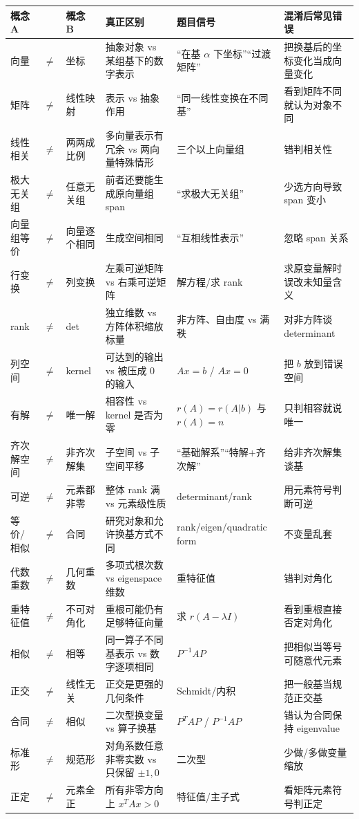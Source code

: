 \documentclass[11pt,a4paper,openany]{ctexbook}
\begin{document}
\begin{longtable}{L{1.7cm}@{}>{\centering\arraybackslash}p{0.35cm}@{}L{1.7cm}L{3.3cm}L{3.3cm}L{\dimexpr\linewidth-10.72cm\relax}}
\toprule
\textbf{概念 A} & & \textbf{概念 B} & \textbf{真正区别} & \textbf{题目信号} & \textbf{混淆后常见错误}\\
\midrule
向量 & $\neq$ & 坐标 & 抽象对象 vs 某组基下的数字表示 & “在基 $\alpha$ 下坐标”“过渡矩阵” & 把换基后的坐标变化当成向量变化\\
矩阵 & $\neq$ & 线性映射 & 表示 vs 抽象作用 & “同一线性变换在不同基” & 看到矩阵不同就认为对象不同\\
线性相关 & $\neq$ & 两两成比例 & 多向量表示有冗余 vs 两向量特殊情形 & 三个以上向量组 & 错判相关性\\
极大无关组 & $\neq$ & 任意无关组 & 前者还要能生成原向量组 span & “求极大无关组” & 少选方向导致 span 变小\\
向量组等价 & $\neq$ & 向量逐个相同 & 生成空间相同 & “互相线性表示” & 忽略 span 关系\\
行变换 & $\neq$ & 列变换 & 左乘可逆矩阵 vs 右乘可逆矩阵 & 解方程/求 rank & 求原变量解时误改未知量含义\\
rank & $\neq$ & det & 独立维数 vs 方阵体积缩放标量 & 非方阵、自由度 vs 满秩 & 对非方阵谈 determinant\\
列空间 & $\neq$ & kernel & 可达到的输出 vs 被压成 0 的输入 & $Ax=b$ / $Ax=0$ & 把 $b$ 放到错误空间\\
有解 & $\neq$ & 唯一解 & 相容性 vs kernel 是否为零 & $r(A)=r(A|b)$ 与 $r(A)=n$ & 只判相容就说唯一\\
齐次解空间 & $\neq$ & 非齐次解集 & 子空间 vs 子空间平移 & “基础解系”“特解+齐次解” & 给非齐次解集谈基\\
可逆 & $\neq$ & 元素都非零 & 整体 rank 满 vs 元素级性质 & determinant/rank & 用元素符号判断可逆\\
等价/相似 & $\neq$ & 合同 & 研究对象和允许换基方式不同 & rank/eigen/quadratic form & 不变量乱套\\
代数重数 & $\neq$ & 几何重数 & 多项式根次数 vs eigenspace 维数 & 重特征值 & 错判对角化\\
重特征值 & $\neq$ & 不可对角化 & 重根可能仍有足够特征向量 & 求 $r(A-\lambda I)$ & 看到重根直接否定对角化\\
相似 & $\neq$ & 相等 & 同一算子不同基表示 vs 数字逐项相同 & $P^{-1}AP$ & 把相似当等号可随意代元素\\
正交 & $\neq$ & 线性无关 & 正交是更强的几何条件 & Schmidt/内积 & 把一般基当规范正交基\\
合同 & $\neq$ & 相似 & 二次型换变量 vs 算子换基 & $P^TAP$ / $P^{-1}AP$ & 错认为合同保持 eigenvalue\\
标准形 & $\neq$ & 规范形 & 对角系数任意非零实数 vs 只保留 $\pm1,0$ & 二次型 & 少做/多做变量缩放\\
正定 & $\neq$ & 元素全正 & 所有非零方向上 $x^TAx>0$ & 特征值/主子式 & 看矩阵元素符号判正定\\
\bottomrule
\end{longtable}
\end{document}
